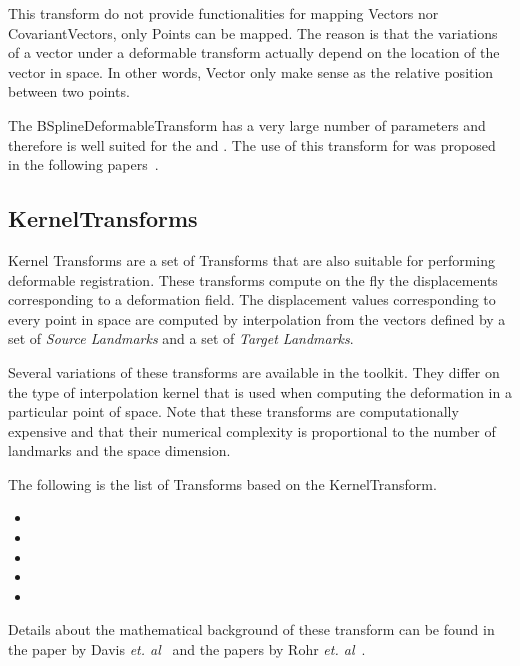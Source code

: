 This transform do not provide functionalities for mapping Vectors nor
CovariantVectors, only Points can be mapped. The reason is that the variations
of a vector under a deformable transform actually depend on the location of the
vector in space. In other words, Vector only make sense as the relative
position between two points.

The BSplineDeformableTransform has a very large number of parameters and
therefore is well suited for the  and
. The use of this transform for was proposed in the
following papers~\cite{Rueckert1999,Mattes2001,Mattes2003}.




\subsection{KernelTransforms}
\label{sec:KernelTransforms}

Kernel Transforms are a set of Transforms that are also suitable for performing
deformable registration. These transforms compute on the fly the displacements
corresponding to a deformation field. The displacement values corresponding to
every point in space are computed by interpolation from the vectors defined by
a set of \emph{Source Landmarks} and a set of \emph{Target Landmarks}.

Several variations of these transforms are available in the toolkit. They
differ on the type of interpolation kernel that is used when computing the
deformation in a particular point of space. Note that these transforms are
computationally expensive and that their numerical complexity is proportional
to the number of landmarks and the space dimension.

The following is the list of Transforms based on the KernelTransform.

\begin{itemize}
\item {}
\item {}
\item {}
\item {}
\item {}
\end{itemize}

Details about the mathematical background of these transform can be found in
the paper by Davis \emph{et. al}~\cite{Davis1997} and the papers by Rohr
\emph{et. al}~\cite{Rohr1999,Rohr2001}.



